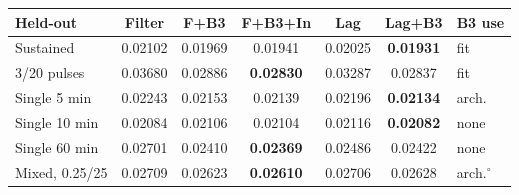 \begin{tabular}{lcccccl}
\toprule
Held-out & Filter & F+B3 & F+B3+In & Lag & Lag+B3 & B3 use \\
\midrule
Sustained & 0.02102 & 0.01969 & 0.01941 & 0.02025 & \textbf{0.01931} & fit \\
3/20 pulses & 0.03680 & 0.02886 & \textbf{0.02830} & 0.03287 & 0.02837 & fit \\
Single 5 min & 0.02243 & 0.02153 & 0.02139 & 0.02196 & \textbf{0.02134} & arch. \\
Single 10 min & 0.02084 & 0.02106 & 0.02104 & 0.02116 & \textbf{0.02082} & none \\
Single 60 min & 0.02701 & 0.02410 & \textbf{0.02369} & 0.02486 & 0.02422 & none \\
Mixed, 0.25/25 & 0.02709 & 0.02623 & \textbf{0.02610} & 0.02706 & 0.02628 & arch.$^\circ$ \\
\bottomrule
\end{tabular}
